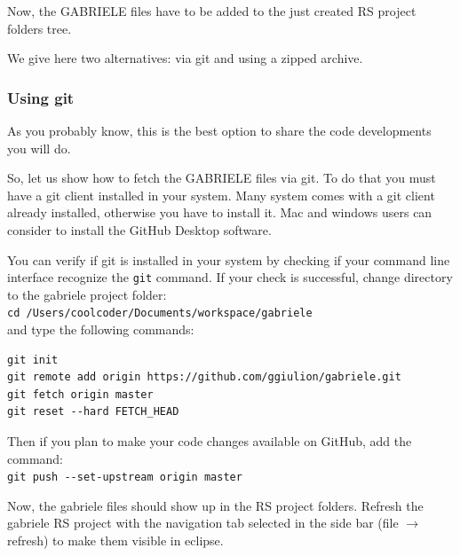 \documentclass{book}
\begin{document}

Now, the GABRIELE files have to be added to the just created RS project folders tree.

We give here two alternatives: via git and using a zipped archive.

\subsubsection{Using git}

As you probably know, this is the best option to share the code developments you will do.

So, let us show how to fetch the GABRIELE files via git. To do that you must have a git client installed in your system. Many system comes with a git client already installed, otherwise you have to install it. Mac and windows users can consider to install the GitHub Desktop software.

You can verify if git is installed in your system by checking if your command line interface recognize the \verb+git+ command.  
If your check is successful, change directory to the gabriele project folder:\\
\verb+cd /Users/coolcoder/Documents/workspace/gabriele+\\
and type the following commands:
\begin{verbatim}
git init
git remote add origin https://github.com/ggiulion/gabriele.git
git fetch origin master
git reset --hard FETCH_HEAD
\end{verbatim}

Then if you plan to make your code changes available on GitHub, add the command:\\
\verb+git push --set-upstream origin master+

Now, the gabriele files should show up in the RS project folders.
Refresh the gabriele RS project with the navigation tab selected in the side bar (file $\rightarrow$ refresh) to make them visible in eclipse.
\end{document}
